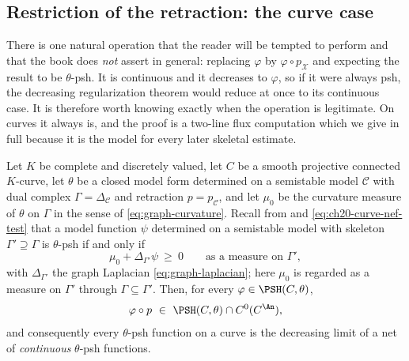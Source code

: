 \subsection{Restriction of the retraction: the curve case}
\label{sec:ch21-curve-retraction}

There is one natural operation that the reader will be tempted to perform
and that the book does \emph{not} assert in general: replacing
\(\varphi\) by \(\varphi\circ p_{\mathcal X}\) and expecting the result to
be \(\theta\)-psh.  It is continuous and it decreases to \(\varphi\), so if
it were always psh, the decreasing regularization theorem
 would reduce at once to its
continuous case.  It is therefore worth knowing exactly when the operation
is legitimate.  On curves it always is, and the proof is a two-line flux
computation which we give in full because it is the model for every later
skeletal estimate.

\begin{proposition}
\label{prop:ch21-curve-retraction}
Let \(K\) be complete and discretely valued, let \(C\) be a smooth
projective connected \(K\)-curve, let \(\theta\) be a closed model form
determined on a semistable model \(\mathcal C\) with dual complex
\(\Gamma=\Delta_{\mathcal C}\) and retraction \(p=p_{\mathcal C}\), and let
\(\mu_0\) be the curvature measure of \(\theta\) on \(\Gamma\) in the sense
of \eqref{eq:graph-curvature}.  Recall from
 and \eqref{eq:ch20-curve-nef-test} that a model
function \(\psi\) determined on a semistable model with skeleton
\(\Gamma'\supseteq\Gamma\) is \(\theta\)-psh if and only if
\begin{equation}
\label{eq:ch21-curve-psh-test}
 \mu_0+\Delta_{\Gamma'}\psi\ \geq\ 0
 \qquad\text{as a measure on }\Gamma' ,
\end{equation}
with \(\Delta_{\Gamma'}\) the graph Laplacian
\eqref{eq:graph-laplacian}; here \(\mu_0\) is regarded as a measure on
\(\Gamma'\) through \(\Gamma\subseteq\Gamma'\).  Then, for every
\(\varphi\in\PSH(C,\theta)\),
\[
 \varphi\circ p\ \in\ \PSH(C,\theta)\cap C^0(C^{\An}),
\]
and consequently every \(\theta\)-psh function on a curve is the decreasing
limit of a net of \emph{continuous} \(\theta\)-psh functions.
\end{proposition}

